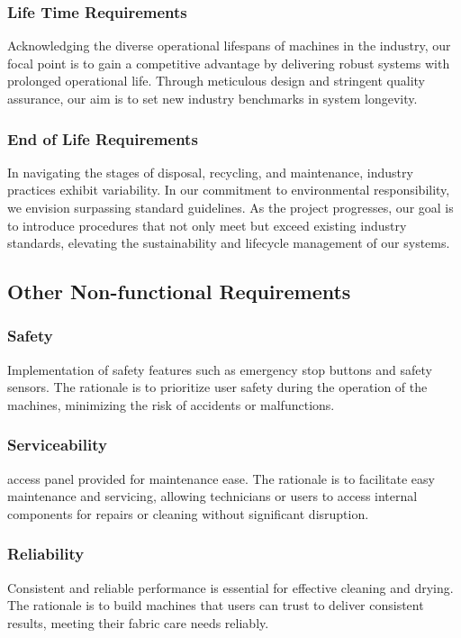\documentclass[12pt]{article} %
\begin{document}
 
 \subsubsection{Life Time Requirements} Acknowledging the diverse operational lifespans of machines in the industry, our focal point is to gain a competitive advantage by delivering robust systems with prolonged operational life. Through meticulous design and stringent quality assurance, our aim is to set new industry benchmarks in system longevity.
 
 \subsubsection{End of Life Requirements} In navigating the stages of disposal, recycling, and maintenance, industry practices exhibit variability. In our commitment to environmental responsibility, we envision surpassing standard guidelines. As the project progresses, our goal is to introduce procedures that not only meet but exceed existing industry standards, elevating the sustainability and lifecycle management of our systems.

\clearpage
\subsection{Other Non-functional Requirements}

 \subsubsection{Safety} Implementation of safety features such as emergency stop buttons and safety sensors. The rationale is to prioritize user safety during the operation of the machines, minimizing the risk of accidents or malfunctions.
 
 \subsubsection{Serviceability} \gls{access panel} provided for maintenance ease. The rationale is to facilitate easy maintenance and servicing, allowing technicians or users to access internal components for repairs or cleaning without significant disruption.
 
 \subsubsection{Reliability} Consistent and reliable performance is essential for effective cleaning and drying. The rationale is to build machines that users can trust to deliver consistent results, meeting their fabric care needs reliably.
 
\end{document}

